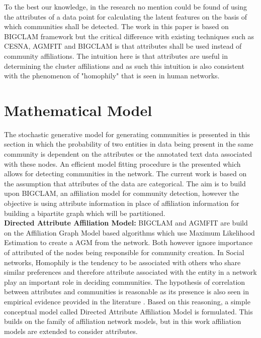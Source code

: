 To the best
our knowledge, in the research no mention could be found
of using the attributes of a data point for calculating the
latent features on the basis of which communities shall be
detected. The work in this paper is based on BIGCLAM framework but
the critical difference with existing techniques such as CESNA, AGMFIT and BIGCLAM is that attributes shall be used instead of community affiliations. The intuition here is that attributes are useful in determining the cluster affiliations and as such this intuition is also consistent with the phenomenon of "homophily" that is seen in human networks.\\




\section{Mathematical Model}
The stochastic generative model for generating communities
is presented in this section in which the probability of two
entities in data being present in the same community is
dependent on the attributes or the annotated text data
associated with these nodes. An efficient model fitting
procedure is the presented which allows for detecting
communities in the network. The current work is based on
the assumption that attributes of the data are categorical. The aim is to build upon BIGCLAM, an affiliation model for
community detection, however the objective is using attribute
information in place of affiliation information for building a bipartite graph which will be partitioned.\\

\textbf{Directed Attribute Affiliation Model:} BIGCLAM and AGMFIT are build on the Affiliation Graph Model based algorithms which use Maximum Likelihood Estimation to create a AGM from the network. Both however ignore importance of attributed of the nodes being responsible for community
creation. In Social networks, Homophily is the tendency to be associated with
others who share similar preferences and therefore attribute
associated with the entity in a network play an important
role in deciding communities. The hypothesis of correlation
between attributes and communities is reasonable as its
presence is also seen in empirical evidence provided in
the literature \cite{aps:53}. Based on this reasoning, a simple
conceptual model called Directed Attribute Affiliation Model
is formulated. This builds on the family of affiliation network
models, but in this work affiliation models are extended to
consider attributes.\\

